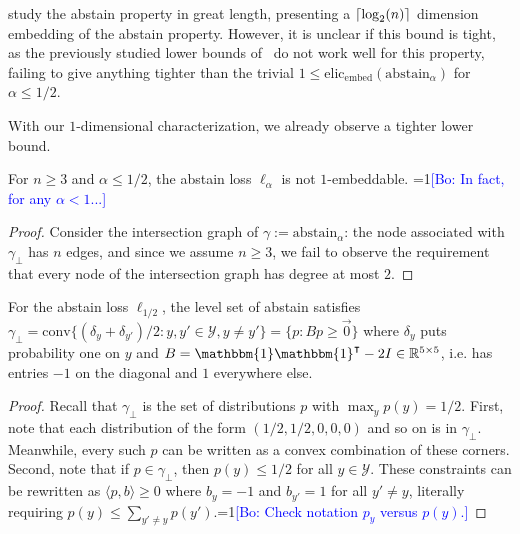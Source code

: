 \documentclass[anon]{colt2020} %
\newcommand{\Comments}{1}
\newcommand{\mynote}[2]{\ifnum\Comments=1\textcolor{#1}{#2}\fi}
\newcommand{\bo}[1]{\mynote{blue}{[Bo: #1]}}
\newcommand{\reals}{\mathbb{R}}
\newcommand{\elicembed}{\mathrm{elic}_\mathrm{embed}}
\newcommand{\abstain}[1]{\mathrm{abstain}_{#1}}
\newcommand{\Y}{\mathcal{Y}}
\newcommand{\inprod}[2]{\langle #1, #2 \rangle}%
\newcommand{\conv}{\mathrm{conv}}
\newcommand{\ones}{\mathbbm{1}}
\DeclarePairedDelimiter\ceil{\lceil}{\rceil}
\begin{document}
\cite{ramaswamy2018consistent} study the abstain property in great length, presenting a $\ceil {\log_2(n)}$ dimension embedding of the abstain property.
However, it is unclear if this bound is tight, as the previously studied lower bounds of~\cite{ramaswamy2016convex} do not work well for this property, failing to give anything tighter than the trivial $1 \leq \elicembed(\abstain{\alpha})$ for $\alpha \leq 1/2$.

With our $1$-dimensional characterization, we already observe a tighter lower bound.
\begin{proposition}
	For $n \geq 3$ and $\alpha \leq 1/2$, the abstain loss $\ell_{\alpha}$ is not $1$-embeddable. \bo{In fact, for any $\alpha < 1$...}
\end{proposition}
\begin{proof}
	Consider the intersection graph of $\gamma := \abstain{\alpha}$: the node associated with $\gamma_\bot$ has $n$ edges, and since we assume $n \geq 3$, we fail to observe the requirement that every node of the intersection graph has degree at most $2$.
\end{proof}

\begin{lemma} \label{lemma:abstain-v-h}
  For the abstain loss $\ell_{1/2}$, the level set of abstain satisfies $\gamma_{\bot} = \conv\{(\delta_y + \delta_{y'})/2 : y,y' \in \Y, y\neq y'\} = \{p : Bp \geq \vec{0}\}$ where $\delta_y$ puts probability one on $y$ and $B = \ones \ones^{\intercal} - 2I \in \reals^{5 \times 5}$, i.e. has entries $-1$ on the diagonal and $1$ everywhere else.
\end{lemma}
\begin{proof}
  Recall that $\gamma_{\bot}$ is the set of distributions $p$ with $\max_y p(y) = 1/2$.
  First, note that each distribution of the form $(1/2, 1/2, 0, 0, 0)$ and so on is in $\gamma_{\bot}$.
  Meanwhile, every such $p$ can be written as a convex combination of these corners.
  Second, note that if $p \in \gamma_{\bot}$, then $p(y) \leq 1/2$ for all $y \in \Y$.
  These constraints can be rewritten as $\inprod{p}{b} \geq 0$ where $b_y = -1$ and $b_{y'} = 1$ for all $y' \neq y$, literally requiring $p(y) \leq \sum_{y' \neq y} p(y')$.\bo{Check notation $p_y$ versus $p(y)$.}
\end{proof}
\end{document}
